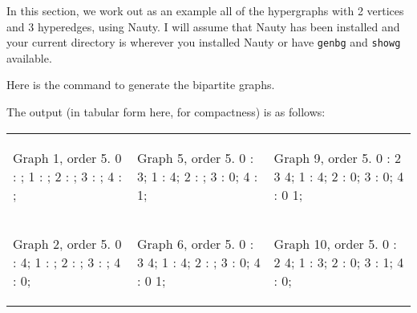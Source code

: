 In this section, we work out as an example all of the hypergraphs with 2 vertices and 3 hyperedges, using Nauty.
I will assume that Nauty has been installed and your current directory is wherever you installed Nauty or have \texttt{genbg} and \texttt{showg} available.

Here is the command to generate the bipartite graphs.


The output (in tabular form here, for compactness) is as follows:

\begin{tabular}{|p{1.5in} | p{1.5in} | p{1.5in} |}
\begin{minipage}{1.5in}
\begin{output}
Graph 1, order 5.
0 : ;
1 : ;
2 : ;
3 : ;
4 : ;

\end{output}
\end{minipage}
&
\begin{minipage}{1.5in}
\begin{output}
Graph 5, order 5.
0 : 3;
1 : 4;
2 : ;
3 : 0;
4 : 1;

\end{output}
\end{minipage}
& 
\begin{minipage}{1.5in}
\begin{output}
Graph 9, order 5.
0 : 2 3 4;
1 : 4;
2 : 0;
3 : 0;
4 : 0 1;

\end{output}
\end{minipage}
\\
\begin{minipage}{1.5in}
\begin{output}
Graph 2, order 5.
0 : 4;
1 : ;
2 : ;
3 : ;
4 : 0;

\end{output}
\end{minipage}
&
\begin{minipage}{1.5in}
\begin{output}
Graph 6, order 5.
0 : 3 4;
1 : 4;
2 : ;
3 : 0;
4 : 0 1;

\end{output}
\end{minipage}
&
\begin{minipage}{1.5in}
\begin{output}
Graph 10, order 5.
0 : 2 4;
1 : 3;
2 : 0;
3 : 1;
4 : 0;


\end{output}
\end{minipage}
\end{tabular}
